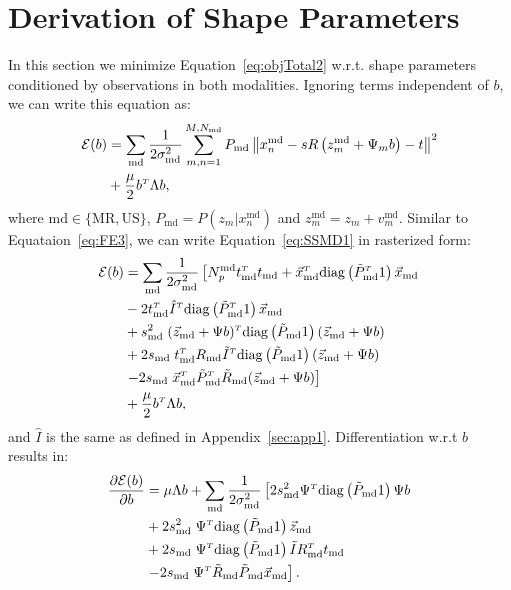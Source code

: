 \documentclass[journal]{IEEEtran}
\newcommand{\di}[2]{\frac{\partial#1}{\partial#2}}
\newcommand{\trans}[1]{#1^{\scriptscriptstyle T}}
\newcommand{\diag}{\mathrm{diag}}
\begin{document}
\section{Derivation of Shape Parameters}\label{sec:app2}
In this section we minimize Equation~\ref{eq:objTotal2} w.r.t. shape parameters conditioned by observations in both modalities. Ignoring terms independent of $b$, we can write this equation as:
\begin{align}\label{eq:SSMD1}
  \mathcal{E}(b) & = \sum_\mathrm{md}\dfrac{1}{2\sigma^2_\mathrm{md}}\sum_{m,n=1}^{M,N_\mathrm{md}}P_\mathrm{md}\left\|x^\mathrm{md}_n-sR\left(z^\mathrm{md}_m+\Psi_mb\right)-t\right\|^2\notag\\
  & + \frac{\mu}{2}\trans{b}\Lambda{b},
\end{align}
where $\mathrm{md}\in\{\mathrm{MR},\mathrm{US}\}$, $P_\mathrm{md}=P(z_m|x^\mathrm{md}_n)$ and $z^\mathrm{md}_m=z_m+v^\mathrm{md}_m$. Similar to Equataion~\ref{eq:FE3}, we can write Equation~\ref{eq:SSMD1} in rasterized form:
\begin{align}\label{eq:SSMD2}
  \mathcal{E}(b) & = \sum_\mathrm{md}\dfrac{1}{2\sigma^2_\mathrm{md}}\left[N^\mathrm{md}_p\trans{t}_\mathrm{md}t_\mathrm{md}+\trans{\vec{x}_\mathrm{md}}\diag\left(\trans{\tilde{P}_\mathrm{md}}1\right)\vec{x}_\mathrm{md}\right.\notag\\
  & -2\trans{t}_\mathrm{md}\trans{\hat{I}}\diag\left(\trans{\tilde{P}_\mathrm{md}}1\right)\vec{x}_\mathrm{md}\notag\\
  & +s^2_\mathrm{md}\;\trans{(\vec{z}_\mathrm{md}+{\Psi}b)}\diag\left(\tilde{P}_\mathrm{md}1\right)(\vec{z}_\mathrm{md}+{\Psi}b)\notag\\
  & +2s_\mathrm{md}\;\trans{t}_\mathrm{md}R_\mathrm{md}\trans{\tilde{I}}\diag\left(\tilde{P}_\mathrm{md}1\right)(\vec{z}_\mathrm{md}+{\Psi}b)\notag\\
  & \left.-2s_\mathrm{md}\;\trans{\vec{x}_\mathrm{md}}\trans{\tilde{P}_\mathrm{md}}\tilde{R}_\mathrm{md}(\vec{z}_\mathrm{md}+{\Psi}b)\right]\notag\\
  & + \frac{\mu}{2}\trans{b}\Lambda{b},
\end{align}
and $\hat{I}$ is the same as defined in Appendix~\ref{sec:app1}. Differentiation w.r.t $b$ results in:
\begin{align}\label{eq:SSMD3}
    \di{\mathcal{E}(b)}{b} & =\mu\Lambda{b}+\sum_\mathrm{md}\dfrac{1}{2\sigma^2_\mathrm{md}}\left[2s^2_\mathrm{md}\trans{\Psi}\diag\left(\tilde{P}_\mathrm{md}1\right){\Psi}b\right.\notag\\
  & +2s^2_\mathrm{md}\;\trans{\Psi}\diag\left(\tilde{P}_\mathrm{md}1\right)\vec{z}_\mathrm{md}\notag\\
  & +2s_\mathrm{md}\;\trans{\Psi}\diag\left(\tilde{P}_\mathrm{md}1\right)\tilde{I}\trans{R}_\mathrm{md}t_\mathrm{md}\notag\\
  & \left.-2s_\mathrm{md}\;\trans{\Psi}\tilde{R}_\mathrm{md}\tilde{P}_\mathrm{md}\vec{x}_\mathrm{md}\right].
\end{align}
\end{document}
